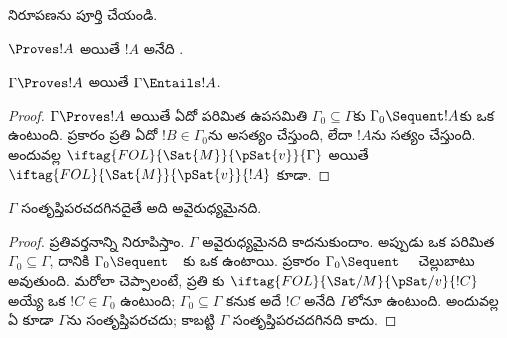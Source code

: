 \documentclass[../../../include/open-logic-section]{subfiles}
\begin{document}
\begin{prob}
 నిరూపణను పూర్తి చేయండి.
\end{prob}
\tagendprob

\begin{cor}
$\Proves !A$ అయితే $!A$ అనేది .
\end{cor}

\begin{cor}
$\Gamma \Proves !A$ అయితే $\Gamma \Entails !A$.
\end{cor}

\begin{proof}
$\Gamma \Proves !A$ అయితే ఏదో పరిమిత ఉపసమితి
$\Gamma_0 \subseteq \Gamma$కు $\Gamma_0 \Sequent !A$కు ఒక
 ఉంటుంది.  ప్రకారం ప్రతి
ఏదో $!B \in \Gamma_0$ను అసత్యం చేస్తుంది, లేదా $!A$ను సత్యం
చేస్తుంది. అందువల్ల $\iftag{FOL}{\Sat{M}}{\pSat{v}}{\Gamma}$ అయితే
$\iftag{FOL}{\Sat{M}}{\pSat{v}}{!A}$ కూడా.
\end{proof}

\begin{cor}
$\Gamma$ సంతృప్తిపరచదగినదైతే అది అవైరుధ్యమైనది.
\end{cor}

\begin{proof}
ప్రతివర్తనాన్ని నిరూపిస్తాం. $\Gamma$ అవైరుధ్యమైనది కాదనుకుందాం.
అప్పుడు ఒక పరిమిత $\Gamma_0 \subseteq \Gamma$, దానికి
$\Gamma_0 \Sequent \quad$కు ఒక  ఉంటాయి.
 ప్రకారం $\Gamma_0 \Sequent \quad$
చెల్లుబాటు అవుతుంది. మరోలా చెప్పాలంటే, ప్రతి
కు
$\iftag{FOL}{\Sat/{M}}{\pSat/{v}}{!C}$ అయ్యే ఒక
$!C \in \Gamma_0$ ఉంటుంది; $\Gamma_0 \subseteq \Gamma$ కనుక అదే
$!C$ అనేది $\Gamma$లోనూ ఉంటుంది. అందువల్ల ఏ
 కూడా $\Gamma$ను
సంతృప్తిపరచదు; కాబట్టి $\Gamma$ సంతృప్తిపరచదగినది కాదు.
\end{proof}
\end{document}
